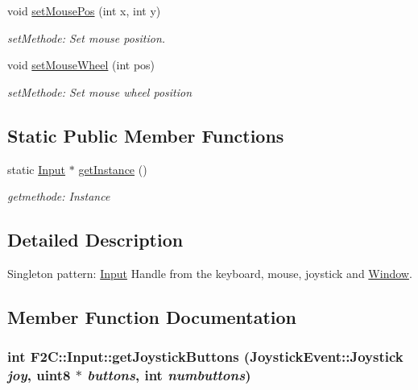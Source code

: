 \begin{DoxyCompactItemize}
void \hyperlink{class_f2_c_1_1_input_a04fd09840025c2d60e483a1d0127255b}{setMousePos} (int x, int y)
\begin{DoxyCompactList}\small\item\em setMethode: Set mouse position. \item\end{DoxyCompactList}\item 
void \hyperlink{class_f2_c_1_1_input_ab28d56430cadbe95356fd30ca5abead6}{setMouseWheel} (int pos)
\begin{DoxyCompactList}\small\item\em setMethode: Set mouse wheel position \item\end{DoxyCompactList}\end{DoxyCompactItemize}
\subsection*{Static Public Member Functions}
\begin{DoxyCompactItemize}
\item 
\hypertarget{class_f2_c_1_1_input_a8fee4ef6592b8bac70d960f35bfddd15}{
static \hyperlink{class_f2_c_1_1_input}{Input} $\ast$ \hyperlink{class_f2_c_1_1_input_a8fee4ef6592b8bac70d960f35bfddd15}{getInstance} ()}
\label{class_f2_c_1_1_input_a8fee4ef6592b8bac70d960f35bfddd15}

\begin{DoxyCompactList}\small\item\em getmethode: Instance \item\end{DoxyCompactList}\end{DoxyCompactItemize}


\subsection{Detailed Description}
Singleton pattern: \hyperlink{class_f2_c_1_1_input}{Input} Handle from the keyboard, mouse, joystick and \hyperlink{class_f2_c_1_1_window}{Window}. 

\subsection{Member Function Documentation}
\hypertarget{class_f2_c_1_1_input_a1049f8515c9466de7635cc230bdd5a27}{
\subsubsection[{getJoystickButtons}]{\setlength{\rightskip}{0pt plus 5cm}int F2C::Input::getJoystickButtons ({\bf JoystickEvent::Joystick} {\em joy}, \/  {\bf uint8} $\ast$ {\em buttons}, \/  int {\em numbuttons})}}
\label{class_f2_c_1_1_input_a1049f8515c9466de7635cc230bdd5a27}


